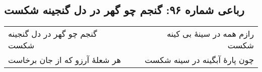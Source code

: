 \begin{center}
\section*{رباعی شماره ۹۶: گنجم چو گهر در دل گنجینه شکست}
\label{sec:sh096}
\begin{longtable}{l p{0.5cm} r}
گنجم چو گهر در دل گنجینه شکست
&&
رازم همه در سینهٔ بی کینه شکست
\\
هر شعلهٔ آرزو که از جان برخاست
&&
چون پارهٔ آبگینه در سینه شکست
\\
\end{longtable}
\end{center}
